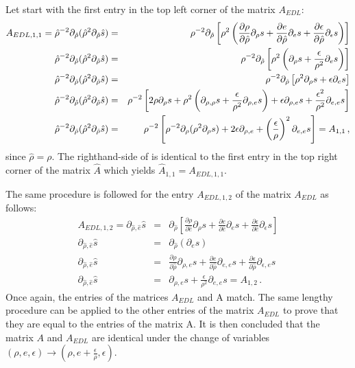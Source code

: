 \documentclass[times,doublespace]{fldauth}%
\begin{document}
%
Let start with the first entry in the top left corner of the matrix $A_{EDL}$:
%
\begin{eqnarray}\label{eq:first_entry_A_hat}
A_{EDL,1,1} = \hat{\rho}^{-2}\partial_{\hat{\rho}}(\hat{\rho}^2 \partial_{\hat{\rho}} \hat{s})& =& \rho^{-2} \partial_{\hat{\rho}} \left[ \rho^2 \left( \frac{\partial \rho}{\partial \hat{\rho}} \partial_\rho s + \frac{\partial e}{\partial \hat{\rho}} \partial_e s + \frac{\partial \epsilon}{\partial \hat{\rho}} \partial_\epsilon s \right) \right] \nonumber \\
\hat{\rho}^{-2}\partial_{\hat{\rho}}(\hat{\rho}^2 \partial_{\hat{\rho}} \hat{s})& =& \rho^{-2} \partial_{\hat{\rho}} \left[ \rho^2 \left( \partial_\rho s + \frac{\epsilon}{\rho^2} \partial_e s \right) \right] \nonumber \\
\hat{\rho}^{-2}\partial_{\hat{\rho}}(\hat{\rho}^2 \partial_{\hat{\rho}} \hat{s})& =& \rho^{-2} \partial_{\hat{\rho}} \left[ \rho^2 \partial_\rho s + \epsilon \partial_e s \right] \nonumber \\
\hat{\rho}^{-2}\partial_{\hat{\rho}}(\hat{\rho}^2 \partial_{\hat{\rho}} \hat{s})& =& \rho^{-2} \left[ 2\rho \partial_\rho s + \rho^2 \left( \partial_{\rho,\rho} s + \frac{\epsilon}{\rho^2} \partial_{\rho,e} s \right) + \epsilon \partial_{\rho,e} s + \frac{\epsilon^2}{\rho^2}\partial_{e,e} s \right] \nonumber \\
\hat{\rho}^{-2}\partial_{\hat{\rho}}(\hat{\rho}^2 \partial_{\hat{\rho}} \hat{s})& =& \rho^{-2} \left[ \rho^{-2}\partial_{\rho}(\rho^2 \partial_{\rho} s) + 2 \epsilon \partial_{\rho,e} + \left( \frac{\epsilon}{\rho} \right)^2 \partial_{e,e} s \right] = A_{1,1} \, ,
\end{eqnarray}
%
since $\hat{\rho} = \rho$. The righthand-side of  is identical to the first entry in the top right corner of the matrix $\hat{A}$ which yields $\hat{A}_{1,1} = A_{EDL,1,1}$. 

The same procedure is followed for the entry $A_{EDL,1,2}$ of the matrix $A_{EDL}$ as follows:
%
\begin{eqnarray}\label{eq:scd_entry_A_hat}
A_{EDL,1,2} = \partial_{\hat{\rho},\hat{e}} \hat{s}& =& \partial_{\hat{\rho}} \left[ \frac{\partial \rho}{\partial \hat{e}} \partial_\rho s + \frac{\partial e}{\partial \hat{e}} \partial_e s + \frac{\partial \epsilon}{\partial \hat{e}} \partial_\epsilon s \right] \nonumber \\ 
\partial_{\hat{\rho},\hat{e}} \hat{s}& =& \partial_{\hat{\rho}} \left( \partial_e s \right) \nonumber \\
\partial_{\hat{\rho},\hat{e}} \hat{s}& = &\frac{\partial \rho}{\partial \hat{\rho}} \partial_{\rho,e} s + \frac{\partial e}{\partial \hat{\rho}} \partial_{e,e} s + \frac{\partial \epsilon}{\partial \hat{\rho}} \partial_{\epsilon,e} s \nonumber \\
\partial_{\hat{\rho},\hat{e}} \hat{s}& = &\partial_{\rho,e} s + \frac{\epsilon}{\rho^2} \partial_{e,e} s = A_{1,2} \, .
\end{eqnarray}
%
Once again, the entries of the matrices $A_{EDL}$ and A match. The same lengthy procedure can be applied to the other entries of the matrix $A_{EDL}$ to prove that they are equal to the entries of the matrix A. It is then concluded that the matrix $A$ and $A_{EDL}$ are identical under the change of variables $(\rho, e, \epsilon) \rightarrow (\rho, e+ \frac{\epsilon}{\rho}, \epsilon)$.\\
\end{document}

